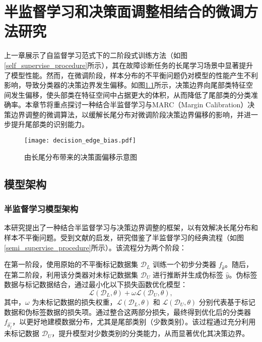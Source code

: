 \documentclass[master]{thesis-uestc}
\begin{document}
\chapter{半监督学习和决策面调整相结合的微调方法研究}
上一章展示了自监督学习范式下的二阶段式训练方法（如图\ref{self_supervise_procedure}所示），其在故障诊断任务的长尾学习场景中显著提升了模型性能。然而，在微调阶段，样本分布的不平衡问题仍对模型的性能产生不利影响，导致分类器的决策边界发生偏移。如图\ref{decision_edge_bias}所示，决策边界向尾部类特征空间发生偏移，使头部类在特征空间中占据更大的体积，从而降低了尾部类的分类准确率。本章节将重点探讨一种结合半监督学习与MARC（Margin Calibration）决策边界调整的微调算法，以缓解长尾分布对微调阶段决策边界偏移的影响，并进一步提升尾部类的识别能力。

\begin{figure}[h]
    \centering
    \texttt{[image: decision\_edge\_bias.pdf]}
    \caption{由长尾分布带来的决策面偏移示意图}
    \label{decision_edge_bias}
\end{figure}

\section{模型架构}
\subsection{半监督学习模型架构}
本研究提出了一种结合半监督学习与决策边界调整的框架，以有效解决长尾分布和样本不平衡问题。受到文献\cite{yang2020rethinking,wang2023margin}的启发，研究借鉴了半监督学习的经典流程（如图\ref{semi_supervise_procedure}所示）。该流程分为两个阶段：

在第一阶段，使用原始的不平衡标记数据集 $\mathcal{D}_{L}$ 训练一个初步分类器 $f_{\hat{\theta}}$。随后，在第二阶段，利用该分类器对未标记数据集 $\mathcal{D}_{U}$ 进行推断并生成伪标签 $\hat{y}$。伪标签数据与标记数据结合，通过最小化以下损失函数优化模型：
\begin{equation} 
    \mathcal{L}(\mathcal{D}_{L},\theta) + \omega \mathcal{L}(\mathcal{D}_{U},\theta), 
\end{equation}
其中，$\omega$ 为未标记数据的损失权重，$\mathcal{L}(\mathcal{D}_{L},\theta)$ 和 $\mathcal{L}(\mathcal{D}_{U},\theta)$ 分别代表基于标记数据和伪标签数据的损失项。通过整合这两部分损失，最终得到优化后的分类器 $f_{\hat{\theta_f}}$，以更好地建模数据分布，尤其是尾部类别（少数类别）。该过程通过充分利用未标记数据 $\mathcal{D}_{U}$，提升模型对少数类别的分类能力，从而显著优化其决策边界。
\end{document}
